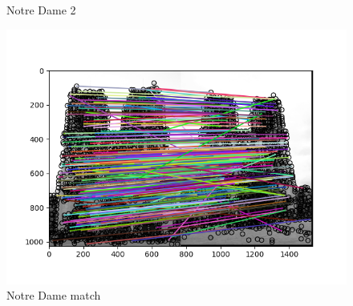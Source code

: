\begin{figure}[h!]
\begin{minipage}[b]{0.3\textwidth}
        \caption{Notre Dame 2}
    \end{minipage}
    \begin{minipage}[b]{0.3\textwidth}
        \includegraphics[width=\textwidth]{imgs/notre_dame3.png}
        \caption{Notre Dame match}
    \end{minipage}
    

\end{figure}
